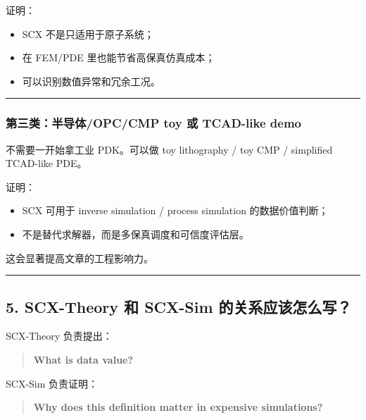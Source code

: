 \documentclass[
  12pt,
]{ctexart}
\providecommand{\tightlist}{%
  \setlength{\itemsep}{0pt}\setlength{\parskip}{0pt}}
\begin{document}
证明：

\begin{itemize}
\tightlist
\item
  SCX 不是只适用于原子系统；
\item
  在 FEM/PDE 里也能节省高保真仿真成本；
\item
  可以识别数值异常和冗余工况。
\end{itemize}

\begin{center}\rule{0.5\linewidth}{0.5pt}\end{center}

\subsubsection{第三类：半导体/OPC/CMP toy 或 TCAD-like
demo}\label{ux7b2cux4e09ux7c7bux534aux5bfcux4f53opccmp-toy-ux6216-tcad-like-demo}

不需要一开始拿工业 PDK。可以做 toy lithography / toy CMP / simplified
TCAD-like PDE。

证明：

\begin{itemize}
\tightlist
\item
  SCX 可用于 inverse simulation / process simulation 的数据价值判断；
\item
  不是替代求解器，而是多保真调度和可信度评估层。
\end{itemize}

这会显著提高文章的工程影响力。

\begin{center}\rule{0.5\linewidth}{0.5pt}\end{center}

\subsection{5. SCX-Theory 和 SCX-Sim
的关系应该怎么写？}\label{scx-theory-ux548c-scx-sim-ux7684ux5173ux7cfbux5e94ux8be5ux600eux4e48ux5199}

SCX-Theory 负责提出：

\begin{quote}
\textbf{What is data value?}
\end{quote}

SCX-Sim 负责证明：

\begin{quote}
\textbf{Why does this definition matter in expensive simulations?}
\end{quote}
\end{document}

